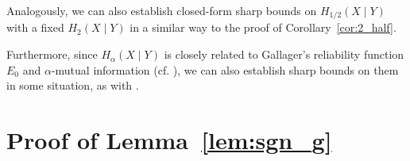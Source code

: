 \documentclass[conference, draftcls, onecolumn]{IEEEtran}
\theoremstyle{plain}
\newcommand{\lemref}[1]{Lemma~\ref{#1}}
\newcommand{\corref}[1]{Corollary~\ref{#1}}
\begin{document}
Analogously, we can also establish closed-form sharp bounds on $H_{1/2}(X \mid Y)$ with a fixed $H_{2}(X \mid Y)$ in a similar way to the proof of \corref{cor:2_half}.

Furthermore, since $H_{\alpha}(X \mid Y)$ is closely related to Gallager's reliability function $E_{0}$ \cite{gallager} and $\alpha$-mutual information \cite{sibson, ho} (cf. \cite{arimoto, ita}), we can also establish sharp bounds on them in some situation, as with \cite[Theorem~5]{part2}.









\appendices





\section{Proof of \lemref{lem:sgn_g}}
\label{app:sgn_g}
\end{document}
